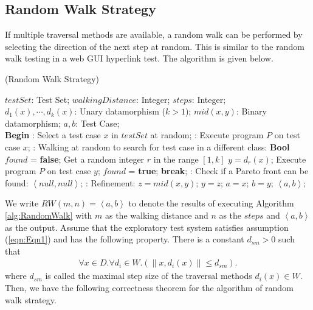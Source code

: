 \documentclass[preprint,1p,authoryear,times]{elsarticle}
\begin{document}
\subsection{Random Walk Strategy}

If multiple traversal methods are available, a random walk can be performed by selecting the direction of the next step at random. This is similar to the random walk testing in a web GUI hyperlink test. The algorithm is given below. 

\begin{algorithm}[h] 
\caption{(Random Walk Strategy)}
\label{alg:RandomWalk}
\begin{small}
\begin{algorithmic}
\Require  
      $testSet$: Test Set; 
      $walkingDistance$: Integer; 
      $steps$: Integer; \\
      $d_1(x),\cdots,d_k(x)$: Unary datamorphism ($k>1$); 
      $mid(x,y)$: Binary datamorphism; 
\Ensure 
      $a, b$: Test Case; \\
\hspace{-0.25cm}\textbf{Begin}
	: Select a test case $x$ in $testSet$ at random;
	: Execute program $P$ on test case $x$;
	: Walking at random to search for test case in a different class:
	\State \textbf{Bool} $found$ = \textbf{false}; 
		\State Get a random integer $r$ in the range $[1,k]$
		\State $y=d_r (x)$;
		\State Execute program $P$ on test case $y$;       
			{$found$ = \textbf{true};  \textbf{break};}
		\EndIf
    \EndFor
    : Check if a Pareto front can be found:
	 { \Return $\left<null, null \right>$; } 
	\EndIf
	: Refinement:
		\State $z = mid(x,y)$;
		 { $y = z$; }
  		\EndIf
	\EndFor
	\State $a = x$; $b = y$;
	\State \Return $\left<a,b \right>$;  \\
\end{algorithmic}
\end{small}
\end{algorithm}

We write $RW(m,n)=\left< a,b \right>$ to denote the results of executing Algorithm \ref{alg:RandomWalk} with $m$ as the walking distance and $n$ as the $steps$ and $\left< a, b \right>$ as the output.
Assume that the exploratory test system satisfies assumption (\ref{eqn:Eqn1}) and has the following property. 
There is a constant $d_{sm} >0$ such that 
\begin{eqnarray}
\forall x \in D. \forall d_i \in W. (\|x, d_i(x)\| \leq d_{sm}). \label{eqn:Eqn4}
\end{eqnarray}
where  $d_{sm}$ is called the maximal step size of the traversal methods $d_i(x) \in W$. 
Then, we have the following correctness theorem for the algorithm of random walk strategy.
\end{document}
